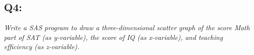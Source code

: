 \documentclass[a4paper,man,natbib]{apa6}
\begin{document}
\subsection*{Q4:}
\emph{Write a SAS program to draw a three-dimensional scatter graph of the score Math part of SAT (as y-variable), the score of IQ (as x-variable), and teaching efficiency (as z-variable).}
	\inputminted[breaklines,bgcolor=light-gray] {sas}{./Snippets/DAT502-HW2-4.sas}





\end{document}
